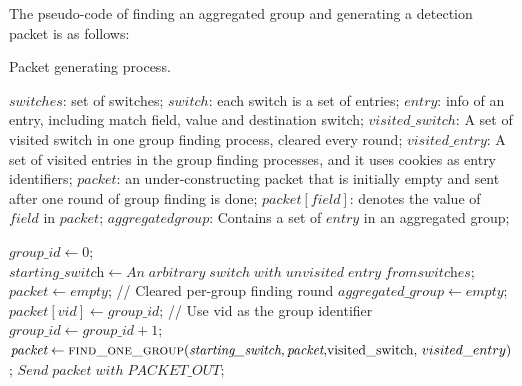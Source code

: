 The pseudo-code of finding an aggregated group and generating a detection packet is as follows:

\begin {tcolorbox}[blanker,float=tbp,
grow to left by=1cm, grow to right by=1cm]
\begin{algorithm}[H]

  \caption{Packet generating process.}
  \begin{algorithmic}[1]
    \Require
      $switches$: set of switches;  \newline
      $switch$: each switch is a set of entries;  \newline
      $entry$: info of an entry, including match field, value and destination switch;  \newline
      $visited\_switch$: A set of visited switch in one group finding process, cleared every round;  \newline
      $visited\_entry$: A set of visited entries \sout{} in the group finding processes, and it uses cookies as entry identifiers; \newline
      $packet$: an under-constructing packet that is initially empty and sent after one round of group finding is done; \newline
      $packet[field]$: denotes the value of $field$ in $packet$; \newline
      $aggregated group$: Contains a set of $entry$ in an aggregated group; \newline

      
      \State $\textit{group\_id} \gets 0$;
            \State $\textit{starting\_switch} \gets An\;arbitrary\;switch\;with\;unvisited\;entry\;from\textit{switches}$;
            \State $\textit{packet} \gets empty$;   // Cleared per-group finding round \sout{}
            \State $\textit{aggregated\_group} \gets empty$;
            \State $packet[vid] \gets \textit{group\_id}$;   // Use vid as the group identifier 
            \State $group\_id \gets \textit{group\_id} + 1$;
            \State $\textit{packet} \gets \Call{find\_one\_group}{\textit{starting\_switch}, \textit{packet}, $visited\_switch, $visited\_entry}$;
            \State \sout{}
            \State $Send\;\textit{packet}\;with\;PACKET\_OUT$;
      \EndWhile
    \EndFunction
    \State
  \end{algorithmic}
\end{algorithm}
\end{tcolorbox}

